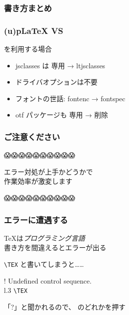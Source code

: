 \begin{frame}[fragile]
	\frametitle{書き方まとめ}
	
\end{frame}

\begin{frame}[fragile]
	\frametitle{(u)p{\LaTeX} VS \LuaLaTeX}
	
	
	\begin{block}{\LuaLaTeX を利用する場合}
		\begin{itemize}
			\scriptsize
			\item jsclasses は \pLaTeX 専用 → ltjsclasses
			\item ドライバオプションは不要
			\item フォントの世話: fontenc → fontspec
			\item otf パッケージも \pLaTeX 専用 → 削除
		\end{itemize}
	\end{block}
\end{frame}


\begin{frame}
	\centering\nishikifont
	\frametitle{ご注意ください}
	\centering\LARGE
	😱😱😱😱😱😱😱😱😱😱
	
	エラー対処が上手かどうかで\\
	作業効率が激変します
	
	😱😱😱😱😱😱😱😱😱😱
\end{frame}

\begin{frame}[fragile]
	\frametitle{エラーに遭遇する}
	\TeX は\emph{プログラミング言語}\\
	書き方を間違えるとエラーが出る
	
	\verb+\TEX+ と書いてしまうと……
	
	\pause
	\bgroup\errorfont
	\begin{tabbing}
		! Undefined control sequence.\\
		l.3 \verb+\TEX+\\
	\end{tabbing}
	\egroup
	\pause
	「{\errorfont ?}」と聞かれるので、  \keys{\return} のどれかを押す
\end{frame}

